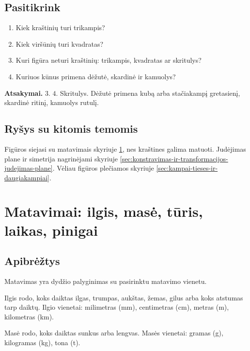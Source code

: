 \subsection{Pasitikrink}

\begin{enumerate}
\item Kiek kraštinių turi trikampis?
\item Kiek viršūnių turi kvadratas?
\item Kuri figūra neturi kraštinių: trikampis, kvadratas ar skritulys?
\item Kuriuos kūnus primena dėžutė, skardinė ir kamuolys?
\end{enumerate}

\textbf{Atsakymai.} \(3\). \(4\). Skritulys. Dėžutė primena kubą arba stačiakampį gretasienį, skardinė ritinį, kamuolys rutulį.

\subsection{Ryšys su kitomis temomis}

Figūros siejasi su matavimais skyriuje \ref{sec:matavimai-ilgis-mase-turis-laikas-pinigai}, nes kraštines galima matuoti. Judėjimas plane ir simetrija nagrinėjami skyriuje \ref{sec:konstravimas-ir-transformacijos-judejimas-plane}. Vėliau figūros plečiamos skyriuje \ref{sec:kampai-tieses-ir-daugiakampiai}.

\section{Matavimai: ilgis, masė, tūris, laikas, pinigai}\label{sec:matavimai-ilgis-mase-turis-laikas-pinigai}

\subsection{Apibrėžtys}

\begin{apibreztis}
Matavimas yra dydžio palyginimas su pasirinktu matavimo vienetu.
\end{apibreztis}

\begin{apibreztis}
Ilgis rodo, koks daiktas ilgas, trumpas, aukštas, žemas, gilus arba koks atstumas tarp daiktų. Ilgio vienetai: milimetras (mm), centimetras (cm), metras (m), kilometras (km).
\end{apibreztis}

\begin{apibreztis}
Masė rodo, koks daiktas sunkus arba lengvas. Masės vienetai: gramas (g), kilogramas (kg), tona (t).
\end{apibreztis}

